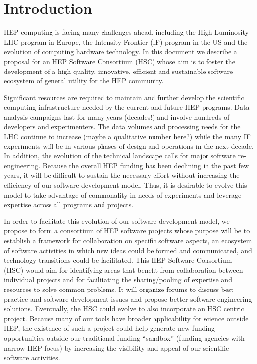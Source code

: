\documentclass[12pt,letterpaper,fleqn]{article}
\begin{document}
\linenumbers

\section{Introduction}
\label{sec:intro}

HEP computing is facing many challenges ahead, including the High
Luminosity LHC program in Europe, the Intensity Frontier (IF) program
in the US and the evolution of computing hardware technology. In
this document we describe a proposal for an HEP Software Consortium
(HSC) whose aim is to foster the development of a high quality,
innovative, efficient and sustainable software ecosystem of general
utility for the HEP community.

Significant resources are required to maintain and further develop
the scientific computing infrastructure needed by the current and
future HEP programs.  Data analysis campaigns last for many years
(decades!) and involve hundreds of developers and experimenters.
The data volumes and processing needs for the LHC continue to
increase (maybe a qualitative number here?) while the many IF
experiments will be in various phases of design and operations in
the next decade.  In addition, the evolution of the technical
landscape calls for major software re-engineering.  Because the
overall HEP funding has been declining in the past few years, it
will be difficult to sustain the necessary effort without increasing
the efficiency of our software development model.   Thus, it is
desirable to evolve this model to take advantage of commonality in
needs of experiments and leverage expertise across all programs and
projects.

In order to facilitate this evolution of our software development
model, we propose to form a consortium of HEP software projects
whose purpose will be to establish a framework for collaboration
on specific software aspects, an ecosystem of software activities
in which new ideas could be formed and communicated, and technology
transitions could be facilitated.  This HEP Software Consortium
(HSC) would aim for identifying areas that benefit from collaboration
between individual projects and for facilitating the sharing/pooling
of expertise and resources to solve common problems.  It will
organize forums to discuss best practice and software development
issues and propose better software engineering solutions.  Eventually,
the HSC could evolve to also incorporate an HSC centric project.
Because many of our tools have broader applicability for science
outside HEP, the existence of such a project could help generate
new funding opportunities outside our traditional funding “sandbox”
(funding agencies with narrow HEP focus) by increasing the visibility
and appeal of our scientific software activities.
\end{document}
